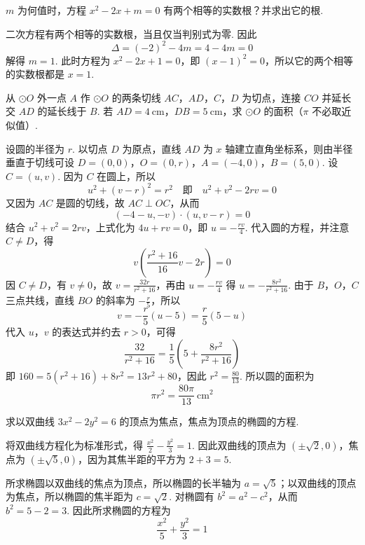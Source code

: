 \begin{problem}
\(m\) 为何值时，方程 \(x^2-2x+m=0\) 有两个相等的实数根？并求出它的根.
\end{problem}

\begin{solution}
二次方程有两个相等的实数根，当且仅当判别式为零. 因此
\[
\Delta=(-2)^2-4m=4-4m=0
\]
解得 \(m=1\). 此时方程为 \(x^2-2x+1=0\)，即 \((x-1)^2=0\)，所以它的两个相等的实数根都是 \(x=1\).
\end{solution}

\begin{problem}
从 \(\odot O\) 外一点 \(A\) 作 \(\odot O\) 的两条切线 \(AC\)，\(AD\)，\(C\)，\(D\) 为切点，连接 \(CO\) 并延长交 \(AD\) 的延长线于 \(B\). 若 \(AD=4\mathrm{~cm}\)，\(DB=5\mathrm{~cm}\)，求 \(\odot O\) 的面积（\(\pi\) 不必取近似值）.

\FloatBarrier
\end{problem}

\begin{solution}
设圆的半径为 \(r\). 以切点 \(D\) 为原点，直线 \(AD\) 为 \(x\) 轴建立直角坐标系，则由半径垂直于切线可设 \(D=(0,0)\)，\(O=(0,r)\)，\(A=(-4,0)\)，\(B=(5,0)\).
设 \(C=(u,v)\). 因为 \(C\) 在圆上，所以
\[
u^2+(v-r)^2=r^2\quad\text{即}\quad u^2+v^2-2rv=0
\]
又因为 \(AC\) 是圆的切线，故 \(AC\perp OC\)，从而
\[
(-4-u,-v)\cdot(u,v-r)=0
\]
结合 \(u^2+v^2=2rv\)，上式化为 \(4u+rv=0\)，即 \(u=-\frac{rv}{4}\). 代入圆的方程，并注意 \(C\neq D\)，得
\[
v\left(\frac{r^2+16}{16}v-2r\right)=0
\]
因 \(C\neq D\)，有 \(v\neq0\)，故 \(v=\frac{32r}{r^2+16}\)，再由 \(u=-\frac{rv}{4}\) 得 \(u=-\frac{8r^2}{r^2+16}\).
由于 \(B\)，\(O\)，\(C\) 三点共线，直线 \(BO\) 的斜率为 \(-\frac{r}{5}\)，所以
\[
v=-\frac{r}{5}(u-5)=\frac{r}{5}(5-u)
\]
代入 \(u\)，\(v\) 的表达式并约去 \(r>0\)，可得
\[
\frac{32}{r^2+16}=\frac{1}{5}\left(5+\frac{8r^2}{r^2+16}\right)
\]
即 \(160=5(r^2+16)+8r^2=13r^2+80\)，因此 \(r^2=\frac{80}{13}\). 所以圆的面积为
\[
\pi r^2=\frac{80\pi}{13}\mathrm{~cm}^2
\]
\end{solution}

\begin{problem}
求以双曲线 \(3x^2-2y^2=6\) 的顶点为焦点，焦点为顶点的椭圆的方程.
\end{problem}

\begin{solution}
将双曲线方程化为标准形式，得 \(\frac{x^2}{2}-\frac{y^2}{3}=1\). 因此双曲线的顶点为 \((\pm\sqrt{2},0)\)，焦点为 \((\pm\sqrt{5},0)\)，因为其焦半距的平方为 \(2+3=5\).

所求椭圆以双曲线的焦点为顶点，所以椭圆的长半轴为 \(a=\sqrt{5}\)；以双曲线的顶点为焦点，所以椭圆的焦半距为 \(c=\sqrt{2}\). 对椭圆有 \(b^2=a^2-c^2\)，从而 \(b^2=5-2=3\). 因此所求椭圆的方程为
\[
\frac{x^2}{5}+\frac{y^2}{3}=1
\]
\end{solution}


